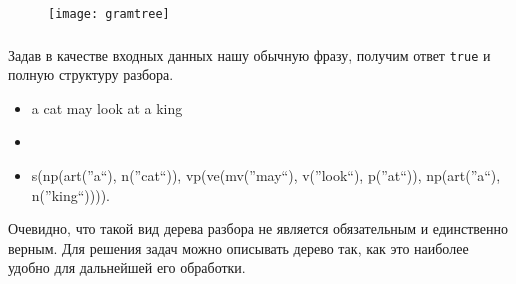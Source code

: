 \begin{frame}

	\frametitle{\insertsection}
	\framesubtitle{\insertsubsection}
	
	\begin{figure}
		\texttt{[image: gramtree]}
	\end{figure}

\end{frame}




\begin{frame}

	\frametitle{\insertsection}
	\framesubtitle{\insertsubsection}
	
	Задав в качестве входных данных нашу обычную фразу, получим ответ \texttt{true} и полную структуру разбора.
	
	\begin{itemize}
		\item[] a cat may look at a king
		\item[]
		\item[] s(np(art(''a``), n(''cat``)), vp(ve(mv(''may``), v(''look``), p(''at``)), np(art(''a``), n(''king``)))).
	\end{itemize}

	Очевидно, что такой вид дерева разбора не является обязательным и единственно верным. Для решения задач можно описывать дерево так, как это наиболее удобно для дальнейшей его обработки.

\end{frame}



